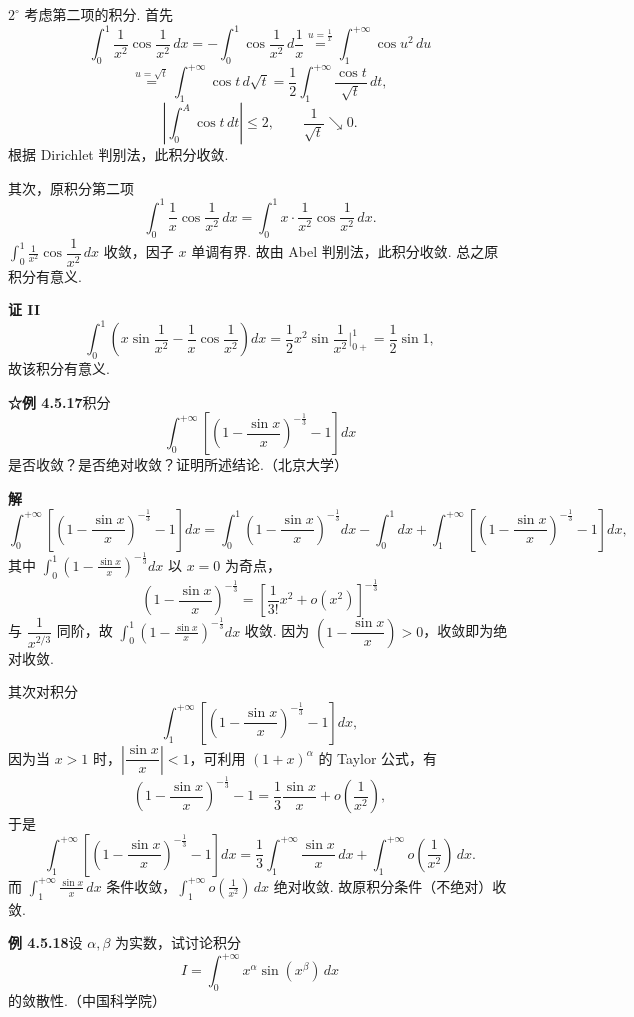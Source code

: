 \documentclass[UTF8, 12pt, fontset=fandol, oneside]{ctexart}
\begin{document}
$2^\circ$ 考虑第二项的积分. 首先
\[
\int_0^1\frac1{x^2}\cos\frac1{x^2}\,dx
=-\int_0^1\cos\frac1{x^2}\,d\frac1x
\stackrel{u=\frac1x}{=}\int_1^{+\infty}\cos u^2\,du
\]
\[
\stackrel{u=\sqrt t}{=}\int_1^{+\infty}\cos t\,d\sqrt t
=\frac12\int_1^{+\infty}\frac{\cos t}{\sqrt t}\,dt,
\]
\[
\left|\int_0^A\cos t\,dt\right|\le2,\qquad \frac1{\sqrt t}\searrow0.
\]
根据 Dirichlet 判别法，此积分收敛.

其次，原积分第二项
\[
\int_0^1\frac1x\cos\frac1{x^2}\,dx
=\int_0^1 x\cdot\frac1{x^2}\cos\frac1{x^2}\,dx.
\]
$\displaystyle\int_0^1\frac1{x^2}\cos\dfrac1{x^2}\,dx$ 收敛，因子 $x$ 单调有界. 故由 Abel 判别法，此积分收敛. 总之原积分有意义.

\noindent\textbf{证 II}\quad
\[
\int_0^1\left(x\sin\frac1{x^2}-\frac1x\cos\frac1{x^2}\right)dx
=\frac12x^2\sin\frac1{x^2}\Big|_{0+}^1=\frac12\sin1,
\]
故该积分有意义.

\noindent\textbf{☆例 4.5.17}\quad 积分
\[
\int_0^{+\infty}\left[\left(1-\frac{\sin x}{x}\right)^{-\frac13}-1\right]dx
\]
是否收敛？是否绝对收敛？证明所述结论.（北京大学）

\noindent\textbf{解}\quad
\[
\int_0^{+\infty}\left[\left(1-\frac{\sin x}{x}\right)^{-\frac13}-1\right]dx
=\int_0^1\left(1-\frac{\sin x}{x}\right)^{-\frac13}dx-\int_0^1dx
+\int_1^{+\infty}\left[\left(1-\frac{\sin x}{x}\right)^{-\frac13}-1\right]dx,
\]
其中 $\displaystyle\int_0^1\left(1-\frac{\sin x}{x}\right)^{-\frac13}dx$ 以 $x=0$ 为奇点，
\[
\left(1-\frac{\sin x}{x}\right)^{-\frac13}
=\left[\frac1{3!}x^2+o(x^2)\right]^{-\frac13}
\]
与 $\dfrac1{x^{2/3}}$ 同阶，故 $\displaystyle\int_0^1\left(1-\frac{\sin x}{x}\right)^{-\frac13}dx$ 收敛. 因为 $\left(1-\dfrac{\sin x}{x}\right)>0$，收敛即为绝对收敛.

其次对积分
\[
\int_1^{+\infty}\left[\left(1-\frac{\sin x}{x}\right)^{-\frac13}-1\right]dx,
\]
因为当 $x>1$ 时，$\left|\dfrac{\sin x}{x}\right|<1$，可利用 $(1+x)^\alpha$ 的 Taylor 公式，有
\[
\left(1-\frac{\sin x}{x}\right)^{-\frac13}-1
=\frac13\frac{\sin x}{x}+o\left(\frac1{x^2}\right),
\]
于是
\[
\int_1^{+\infty}\left[\left(1-\frac{\sin x}{x}\right)^{-\frac13}-1\right]dx
=\frac13\int_1^{+\infty}\frac{\sin x}{x}\,dx
+\int_1^{+\infty}o\left(\frac1{x^2}\right)\,dx.
\]
而 $\displaystyle\int_1^{+\infty}\frac{\sin x}{x}\,dx$ 条件收敛，$\displaystyle\int_1^{+\infty}o\left(\frac1{x^2}\right)\,dx$ 绝对收敛. 故原积分条件（不绝对）收敛.

\noindent\textbf{例 4.5.18}\quad 设 $\alpha,\beta$ 为实数，试讨论积分
\[
I=\int_0^{+\infty}x^\alpha\sin(x^\beta)\,dx
\]
的敛散性.（中国科学院）
\end{document}

